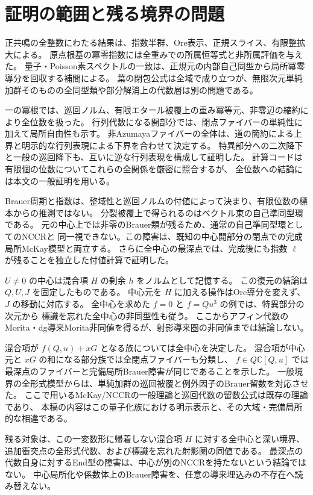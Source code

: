 \section{証明の範囲と残る境界の問題}

正共鳴の全整数にわたる結果は、指数半群、Ore表示、正規スライス、有限整拡大による。
原点根基の冪零指数には全重みでの所属恒等式と非所属評価を与えた。
量子・Poisson素スペクトルの一致は、正規元の内部自己同型から局所冪零導分を回収する補間による。
葉の閉包公式は全域で成り立つが、無限次元単純加群そのものの全同型類や部分解消上の代数層は別の問題である。

一の冪根では、巡回ノルム、有限エタール被覆上の重み冪等元、非零辺の縮約により全位数を扱った。
行列代数になる開部分では、閉点ファイバーの単純性に加えて局所自由性も示す。
非Azumayaファイバーの全体は、道の簡約による上界と明示的な行列表現による下界を合わせて決定する。
特異部分への二次降下と一般の巡回降下も、互いに逆な行列表現を構成して証明した。
計算コードは有限個の位数についてこれらの全関係を厳密に照合するが、
全位数への結論には本文の一般証明を用いる。

Brauer周期と指数は、整域性と巡回ノルムの付値によって決まり、有限位数の標本からの推測ではない。
分裂被覆上で得られるのはベクトル束の自己準同型環である。
元の中心上では非零のBrauer類が残るため、通常の自己準同型環としてのNCCRと
同一視できない。この障害は、既知の中心開部分の閉点での完成局所McKay模型と両立する。
さらに全中心の最深点では、完成後にも指数 $\ell$ が残ることを独立した付値計算で証明した。

$U\ne0$ の中心は混合項 $H$ の剰余 $h$ をノルムとして記憶する。
この復元の結論は $Q,U,J$ を固定したものである。
中心元を $H$ に加える操作はOre導分を変えず、$J$ の移動に対応する。
全中心を求めた $f=0$ と $f=Qu^3$ の例では、特異部分の次元から
標識を忘れた全中心の非同型性も従う。
ここからアフィン代数のMorita・dg導来Morita非同値を得るが、射影導来圏の非同値までは結論しない。

混合項が $f(Q,u)+xG$ となる族については全中心を決定した。
混合項が中心元と $xG$ の和になる部分族では全閉点ファイバーも分類し、
$f\in Q\mathbb C[Q,u]$ では最深点のファイバーと完備局所Brauer障害が同じであることを示した。
一般境界の全形式模型からは、単純加群の巡回被覆と例外因子のBrauer留数を対応させた。
ここで用いるMcKay/NCCRの一般理論と巡回代数の留数公式は既存の理論であり、
本稿の内容はこの量子化族における明示表示と、その大域・完備局所的な相違である。

残る対象は、この一変数形に帰着しない混合項 $H$ に対する全中心と深い境界、
追加衝突点の全形式代数、および標識を忘れた射影圏の同値である。
最深点の代数自身に対するEnd型の障害は、中心が別のNCCRを持たないという結論ではない。
中心局所化や係数体上のBrauer障害を、任意の導来埋込みの不存在へ読み替えない。

